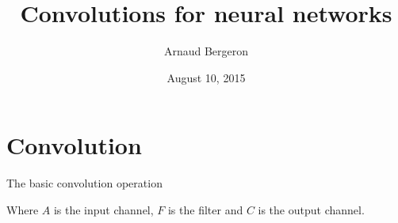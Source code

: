\documentclass[utf8x,hyperref={pdfpagelabels=false}]{beamer}
\title{Convolutions for neural networks}
\author{%
Arnaud Bergeron
}
\date{August 10, 2015}
\begin{document}
\begin{frame}[plain]
 \titlepage
\end{frame}

\setcounter{page}{1}

\section{Convolution}

\begin{frame}
The basic convolution operation
\begin{overlayarea}{\textwidth}{5.6cm}
\end{overlayarea}
Where $A$ is the input channel, $F$ is the filter and $C$ is the output channel.
\end{frame}
\end{document}
